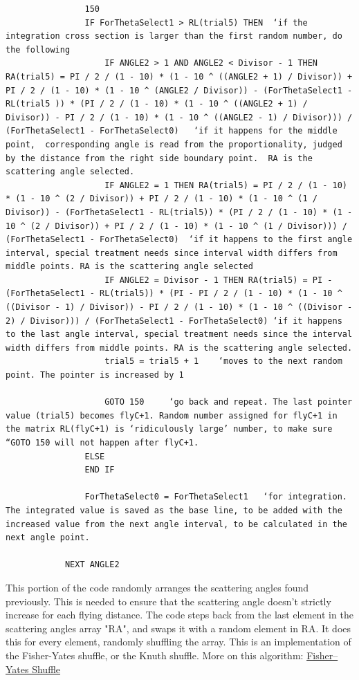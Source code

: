 \documentclass[10pt, reqno]{exam}
\begin{document}
\begin{verbatim}
                150
                IF ForThetaSelect1 > RL(trial5) THEN  ‘if the integration cross section is larger than the first random number, do the following
                    IF ANGLE2 > 1 AND ANGLE2 < Divisor - 1 THEN RA(trial5) = PI / 2 / (1 - 10) * (1 - 10 ^ ((ANGLE2 + 1) / Divisor)) + PI / 2 / (1 - 10) * (1 - 10 ^ (ANGLE2 / Divisor)) - (ForThetaSelect1 - RL(trial5 )) * (PI / 2 / (1 - 10) * (1 - 10 ^ ((ANGLE2 + 1) / Divisor)) - PI / 2 / (1 - 10) * (1 - 10 ^ ((ANGLE2 - 1) / Divisor))) / (ForThetaSelect1 - ForThetaSelect0)   ‘if it happens for the middle point,  corresponding angle is read from the proportionality, judged by the distance from the right side boundary point.  RA is the scattering angle selected.
                    IF ANGLE2 = 1 THEN RA(trial5) = PI / 2 / (1 - 10) * (1 - 10 ^ (2 / Divisor)) + PI / 2 / (1 - 10) * (1 - 10 ^ (1 / Divisor)) - (ForThetaSelect1 - RL(trial5)) * (PI / 2 / (1 - 10) * (1 - 10 ^ (2 / Divisor)) + PI / 2 / (1 - 10) * (1 - 10 ^ (1 / Divisor))) / (ForThetaSelect1 - ForThetaSelect0)  ‘if it happens to the first angle interval, special treatment needs since interval width differs from middle points. RA is the scattering angle selected
                    IF ANGLE2 = Divisor - 1 THEN RA(trial5) = PI - (ForThetaSelect1 - RL(trial5)) * (PI - PI / 2 / (1 - 10) * (1 - 10 ^ ((Divisor - 1) / Divisor)) - PI / 2 / (1 - 10) * (1 - 10 ^ ((Divisor - 2) / Divisor))) / (ForThetaSelect1 - ForThetaSelect0) ‘if it happens to the last angle interval, special treatment needs since the interval width differs from middle points. RA is the scattering angle selected.
                    trial5 = trial5 + 1    ‘moves to the next random point. The pointer is increased by 1 
    
                    GOTO 150     ‘go back and repeat. The last pointer value (trial5) becomes flyC+1. Random number assigned for flyC+1 in the matrix RL(flyC+1) is ‘ridiculously large’ number, to make sure “GOTO 150 will not happen after flyC+1. 
                ELSE
                END IF
    
                ForThetaSelect0 = ForThetaSelect1   ‘for integration. The integrated value is saved as the base line, to be added with the increased value from the next angle interval, to be calculated in the next angle point. 
    
            NEXT ANGLE2
\end{verbatim}

This portion of the code randomly arranges the scattering angles found previously. This is needed to ensure that the scattering angle doesn't strictly increase for each flying distance. The code steps back from the last element in the scattering angles array "RA", and swaps it with a random element in RA. It does this for every element, randomly shuffling the array. This is an implementation of the Fisher-Yates shuffle, or the Knuth shuffle. More on this algorithm: \href{https://en.wikipedia.org/wiki/Fisher%E2%80%93Yates_shuffle}{Fisher--Yates Shuffle}
\end{document}
